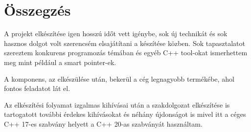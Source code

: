 \chapter{Összegzés}
\label{ch:sum}

A projekt elkészítése igen hosszú időt vett igénybe, sok új technikát és sok hasznos dolgot volt szerencsém elsajátítani a készítése közben. Sok tapasztalatot szereztem konkurens programozás témában és egyéb C++ tool-okat ismerhettem meg mint például a smart pointer-ek.

A komponens, az elkészülése után, bekerül a cég legnagyobb termékébe, ahol fontos feladatot lát el.

Az elkészítési folyamat izgalmas kihívásai után a szakdolgozat elkészítése is tartogatott további érdekes kihívásokat és néhány újdonságot is mivel itt a céges C++ 17-es szabvány helyett a C++ 20-as szabványát használtam.